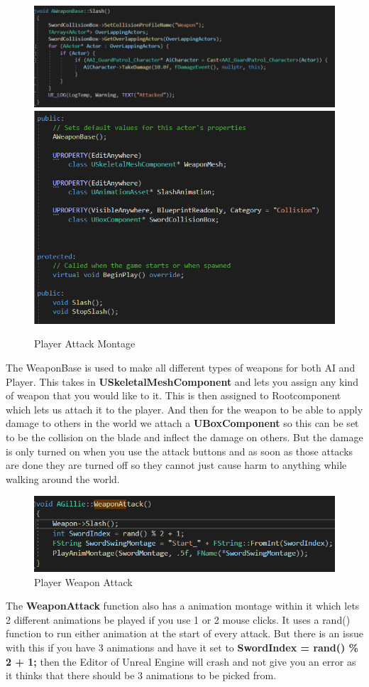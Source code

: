 \begin{figure}[H]
    \centering
    \includegraphics[scale=.4]{img/Slash.PNG}
    \includegraphics[scale=.4]{img/WeaponBaseH.PNG}
    \caption{Player Attack Montage}
    \label{Attack Montage}
\end{figure}
The WeaponBase is used to make all different types of weapons for both AI and Player. This takes in \textbf{USkeletalMeshComponent} and lets you assign any kind of weapon that you would like to it. This is then assigned to Rootcomponent which lets us attach it to the player. And then for the weapon to be able to apply damage to others in the world we attach a \textbf{UBoxComponent} so this can be set to be the collision on the blade and inflect the damage on others. But the damage is only turned on when you use the attack buttons and as soon as those attacks are done they are turned off so they cannot just cause harm to anything while walking around the world.
\begin{figure}[H]
    \centering
    \includegraphics[scale=.6]{img/WeaponAttack.PNG}
    \caption{Player Weapon Attack}
    \label{WeaponAttack}
\end{figure}
The \textbf{WeaponAttack} function also has a animation montage within it which lets 2 different animations be played if you use 1 or 2 mouse clicks. It uses a rand() function to run either animation at the start of every attack. But there is an issue with this if you have 3 animations and have it set to \textbf{SwordIndex = rand() \% 2 + 1;} then the Editor of Unreal Engine will crash and not give you an error as it thinks that there should be 3 animations to be picked from.
